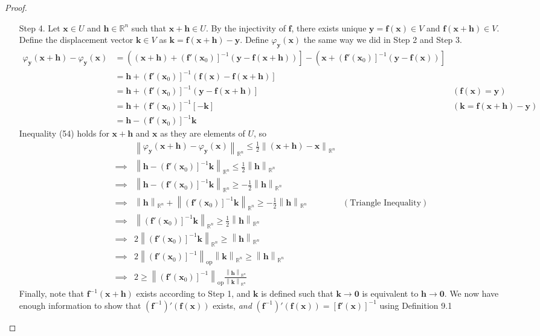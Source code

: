 \documentclass{article}
\newcommand{\R}{\mathbb{R}}
\newcommand{\x}{\mathbf{x}}
\newcommand{\f}{\mathbf{f}}
\newcommand{\y}{\mathbf{y}}
\newcommand{\h}{\mathbf{h}}
\newcommand{\ze}{\mathbf{0}}
\newcommand{\norm}[1]{\left\lVert#1\right\rVert}
\newcommand{\normop}[1]{\left\lVert#1\right\rVert_\text{op}}
\theoremstyle{definition}
\begin{document}
\begin{proof}
\begin{enumerate}
			\item [Step 4.] Let $ \x \in U $ and $ \h\in\R^n  $ such that $ \x+\h \in U $. By the injectivity of $ \f $, there exists unique $ \y = \f(\x)\in V $ and $ \f(\x+\mathbf h) \in V $. Define the displacement vector $ \mathbf k\in V $ as $ \mathbf k = \f(\x+\mathbf h) - \y $. Define $ \varphi_\y(\x) $ the same way we did in Step 2 and Step 3.  
			\begin{align*}
				\varphi_\y(\x+\h) - \varphi_\y(\x) & = \left((\x+\h) + \left(\f'(\x_0)\right]^{-1}(\y-\f(\x+\h))\right] - \left(\x + \left(\f'(\x_0)\right]^{-1}(\y-\f(\x))\right] \\ 
				& = \h + \left(\f'(\x_0)\right]^{-1}\left(\f(\x) - \f(\x + \h) \right] \\ 
				& = \h + \left(\f'(\x_0)\right]^{-1}\left(\y - \f(\x + \h) \right] & (\f(\x) = \y)\\
				& = \h + \left(\f'(\x_0)\right]^{-1}[-\mathbf k]  & (\mathbf k =\f(\x+\mathbf h) -\y)\\
				& = \h - \left(\f'(\x_0)\right]^{-1}\mathbf k
			\end{align*}
			Inequality (54) holds for $ \x+\h $ and $ \x $ as they are elements of $ U $, so 
			\begin{align}
				&\norm{	\varphi_\y(\x+\h) - \varphi_\y(\x) }_{\R^n}\le \frac{1}{2}\norm{(\x+\h) - \x}_{\R^n}\nonumber\\
				\implies& \norm{\h - \left(\f'(\x_0)\right]^{-1}\mathbf k }_{\R^n} \le \frac{1}{2}\norm{\h}_{\R^n} \nonumber\\
				\implies & \norm{\h - \left(\f'(\x_0)\right]^{-1}\mathbf k }_{\R^n} \ge -\frac{1}{2}\norm{\h}_{\R^n}\nonumber\\\implies & \norm{\h}_{\R^n} + \norm{\left(\f'(\x_0)\right]^{-1}\mathbf k }_{\R^n} \ge -\frac{1}{2}\norm{\h}_{\R^n} & (\text{Triangle Inequality})\nonumber\\
				\implies &\norm{\left(\f'(\x_0)\right]^{-1}\mathbf k }_{\R^n} \ge \frac{1}{2}\norm{\h}_{\R^n} \nonumber\\
				\implies &2\norm{\left(\f'(\x_0)\right]^{-1}\mathbf k }_{\R^n} \ge \norm{\h}_{\R^n} \nonumber \\ 
				\implies &2\normop{\left(\f'(\x_0)\right]^{-1}} \norm{\mathbf k }_{\R^n}\ge \norm{\h}_{\R^n} \nonumber
				\\ 
				\implies &2\ge \normop{\left(\f'(\x_0)\right]^{-1}}\frac{\norm{\mathbf h}_{\R^n}}{\norm{\mathbf k}_{\R^n}}
			\end{align}
			Finally, note that $ \f^{-1}(\x+\h) $ exists according to Step 1, and $ \mathbf k $ is defined such that $ \mathbf k\to\ze  $ is equivalent to $ \mathbf h\to \ze $. We now have enough information to show that $(\f^{-1})'(\f(\x))$ exists, \textit{and} $(\f^{-1})'(\f(\x))= [\f'(\x)]^{-1}$ using Definition 9.1 

\end{enumerate}
\end{proof}
\end{document}
